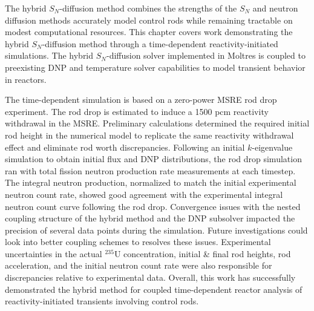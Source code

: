 The hybrid $S_N$-diffusion method combines the strengths of the $S_N$ and neutron
diffusion methods accurately model control rods while remaining tractable on modest computational
resources. This chapter covers work demonstrating the hybrid $S_N$-diffusion method through a
time-dependent reactivity-initiated simulations. The hybrid $S_N$-diffusion solver implemented in
Moltres is coupled to preexisting \gls{DNP} and temperature solver capabilities to model
transient behavior in reactors. 

The time-dependent simulation is based on a zero-power \gls{MSRE} rod drop experiment. The
rod drop is estimated to induce a 1500 pcm reactivity withdrawal in the \gls{MSRE}. Preliminary
calculations determined the required initial rod height in the numerical model to replicate the
same reactivity withdrawal effect and eliminate rod worth discrepancies. Following an initial
$k$-eigenvalue simulation to obtain initial flux and \gls{DNP} distributions, the rod drop
simulation ran with total fission neutron production rate measurements at each timestep. The
integral neutron production, normalized to match the initial experimental neutron count rate,
showed good agreement with the experimental integral neutron count curve following the rod drop.
Convergence issues with the nested coupling structure of the hybrid method and the \gls{DNP}
subsolver impacted the precision of several data points during the simulation.
Future investigations could look into better coupling schemes to resolves these issues.
Experimental uncertainties in the actual $^{235}$U concentration, initial \& final rod heights, rod
acceleration, and the initial neutron count rate were also responsible for discrepancies relative
to experimental data.
Overall, this work has successfully demonstrated the hybrid method for coupled time-dependent
reactor analysis of reactivity-initiated transients involving control rods.
